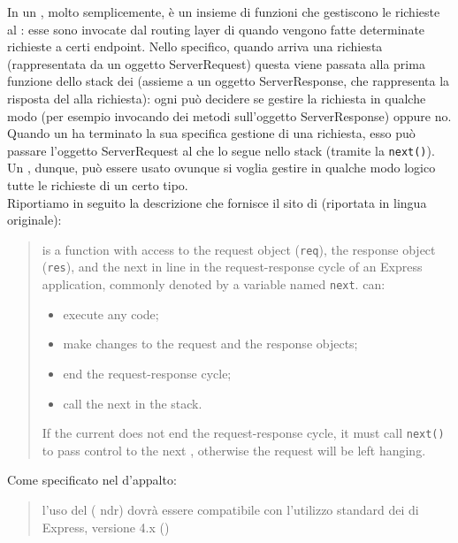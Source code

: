  \label{app:express}
		In  un , molto semplicemente, è un insieme di funzioni che gestiscono le richieste al : esse sono invocate dal routing layer di  quando vengono fatte determinate richieste  a certi endpoint. Nello specifico, quando arriva una richiesta (rappresentata da un oggetto ServerRequest) questa viene passata alla prima funzione dello stack dei  (assieme a un oggetto ServerResponse, che rappresenta la risposta del  alla richiesta): ogni  può decidere se gestire la richiesta in qualche modo (per esempio invocando dei metodi sull'oggetto ServerResponse) oppure no. Quando un  ha terminato la sua specifica gestione di una richiesta, esso può passare l'oggetto ServerRequest al  che lo segue nello stack (tramite la  \texttt{next()}). Un , dunque, può essere usato ovunque si voglia gestire in qualche modo logico tutte le richieste di un certo tipo.\\
		Riportiamo in seguito la descrizione che fornisce il sito  di  (riportata in lingua originale):
		\begin{quote}
			 is a function with access to the request object (\texttt{req}), the response object (\texttt{res}), and the next  in line in the request-response cycle of an Express application, commonly denoted by a variable named \texttt{next}.  can:
			\begin{itemize}
				\item execute any code;
				\item make changes to the request and the response objects;
				\item end the request-response cycle;
				\item call the next  in the stack.
			\end{itemize}
			If the current  does not end the request-response cycle, it must call \texttt{next()} to pass control to the next , otherwise the request will be left hanging.
		\end{quote}
		Come specificato nel  d'appalto:
		\begin{quote}
			l'uso del  ( ndr) dovrà essere compatibile con l’utilizzo standard dei  di Express, versione 4.x ()
		\end{quote}
